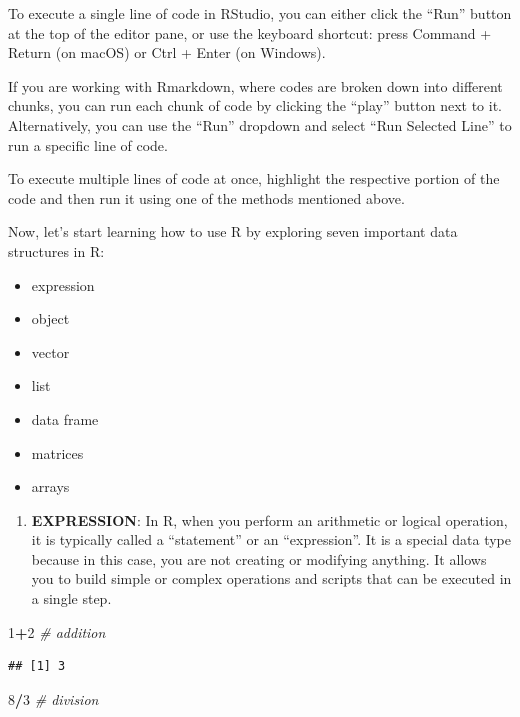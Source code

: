 \documentclass[
]{article}
\newenvironment{Shaded}{\begin{snugshade}}{\end{snugshade}}
\newcommand{\CommentTok}[1]{\textcolor[rgb]{0.56,0.35,0.01}{\textit{#1}}}
\newcommand{\DecValTok}[1]{\textcolor[rgb]{0.00,0.00,0.81}{#1}}
\newcommand{\SpecialCharTok}[1]{\textcolor[rgb]{0.81,0.36,0.00}{\textbf{#1}}}
\providecommand{\tightlist}{%
  \setlength{\itemsep}{0pt}\setlength{\parskip}{0pt}}
\begin{document}
To execute a single line of code in RStudio, you can either click the
``Run'' button at the top of the editor pane, or use the keyboard
shortcut: press Command + Return (on macOS) or Ctrl + Enter (on
Windows).

If you are working with Rmarkdown, where codes are broken down into
different chunks, you can run each chunk of code by clicking the
``play'' button next to it. Alternatively, you can use the ``Run''
dropdown and select ``Run Selected Line'' to run a specific line of
code.

To execute multiple lines of code at once, highlight the respective
portion of the code and then run it using one of the methods mentioned
above.

Now, let's start learning how to use R by exploring seven important data
structures in R:

\begin{itemize}
\tightlist
\item
  expression
\item
  object
\item
  vector
\item
  list
\item
  data frame
\item
  matrices
\item
  arrays
\end{itemize}

\begin{enumerate}
\def\labelenumi{\arabic{enumi}.}
\tightlist
\item
  \textbf{EXPRESSION}: In R, when you perform an arithmetic or logical
  operation, it is typically called a ``statement'' or an
  ``expression''. It is a special data type because in this case, you
  are not creating or modifying anything. It allows you to build simple
  or complex operations and scripts that can be executed in a single
  step.
\end{enumerate}

\begin{Shaded}
\begin{Highlighting}[]
\DecValTok{1}\SpecialCharTok{+}\DecValTok{2} \CommentTok{\# addition}
\end{Highlighting}
\end{Shaded}

\begin{verbatim}
## [1] 3
\end{verbatim}

\begin{Shaded}
\begin{Highlighting}[]
\DecValTok{8}\SpecialCharTok{/}\DecValTok{3} \CommentTok{\# division}
\end{Highlighting}
\end{Shaded}
\end{document}
